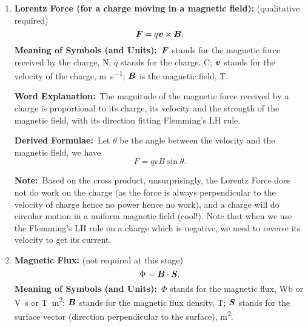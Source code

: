 \documentclass[8pt]{article}
\newcommand{\MeanSymb}{\textbf{Meaning of Symbols (and Units):}\ }
\newcommand{\WordExpl}{\textbf{Word Explanation:}\ }
\newcommand{\DeriForm}{\textbf{Derived Formulae:}\ }
\newcommand{\Note}{\textbf{Note:}\ }
\begin{document}
\begin{enumerate}
                \WordExpl The magnitude of the force the current-carrying wire receives is proportional to the strength of the magnetic field, the current and its length, and the direction fits Flemming's LH rule (cross product).

                \DeriForm Let \(\theta\) be the angle between the wire and the magnetic field, we have
                \[
                    F = BIl \sin \theta.
                \]

                \Note This is cool, and this could be used to define the \(\vect{B}\) field. The cross product simply represents the direction without the need to use the Cartesian coordinate formed by Flemming's LH rule.

                \item \textbf{Lorentz Force (for a charge moving in a magnetic field):} (qualitative required)
                \[
                    \boldsymbol{F} = q\boldsymbol{v} \times \boldsymbol{B}.
                \]
                \MeanSymb \(\boldsymbol{F}\) stands for the magnetic force received by the charge, \unit{\newton}; \(q\) stands for the charge, \unit{\coulomb}; \(\boldsymbol{v}\) stands for the velocity of the charge, \unit{\metre\per\second}; \(\vect{B}\) is the magnetic field, \unit{\tesla}.

                \WordExpl The magnitude of the magnetic force received by a charge is proportional to its charge, its velocity and the strength of the magnetic field, with its direction fitting Flemming's LH rule.

                \DeriForm Let \(\theta\) be the angle between the velocity and the magnetic field, we have
                \[
                    F = qvB \sin \theta.
                \]

                \Note Based on the cross product, unsurprisingly, the Lorentz Force does not do work on the charge (as the force is always perpendicular to the velocity of charge hence no power hence no work), and a charge will do circular motion in a uniform magnetic field (cool!). Note that when we use the Flemming's LH rule on a charge which is negative, we need to reverse its velocity to get its current.

                \item \textbf{Magnetic Flux:} (not required at this stage)
                \[
                    \Phi = \boldsymbol{B} \cdot \boldsymbol{S}.
                \]
                \MeanSymb \(\Phi\) stands for the magnetic flux, \unit{\weber} or \unit{\volt \second} or \unit{\tesla \metre \squared}; \(\vect{B}\) stands for the magnetic flux density, \unit{\tesla}; \(\boldsymbol{S}\) stands for the surface vector (direction perpendicular to the surface), \unit{\metre\squared}.


\end{enumerate}
\end{document}
